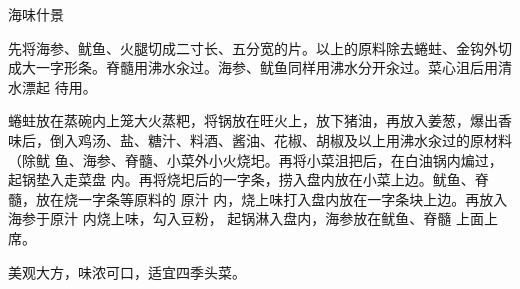 \begin{recipe}{海味什景}

\ingredients


\cooking

\step 先将海参、鱿鱼、火腿切成二寸长、五分宽的片。以上的原料除去蜷蛀、金钩外切
成大一字形条。脊髓用沸水汆过。海参、鱿鱼同样用沸水分开汆过。菜心沮后用清水漂起
待用。

\step 蜷蛀放在蒸碗内上笼大火蒸粑，将锅放在旺火上，放下猪油，再放入姜葱，爆出香
味后，倒入鸡汤、盐、糖汁、料酒、酱油、花椒、胡椒及以上用沸水汆过的原材料（除鱿
鱼、海参、脊髓、小菜外小火烧圯。再将小菜沮把后，在白油锅内煸过，起锅垫入走菜盘
内。再将烧圯后的一字条，捞入盘内放在小菜上边。鱿鱼、脊髓，放在烧一字条等原料的
原汁 内，烧上味打入盘内放在一字条块上边。再放入海参于原汁 内烧上味，勾入豆粉，
起锅淋入盘内，海参放在鱿鱼、脊髓 上面上席。

\notes

美观大方，味浓可口，适宜四季头菜。

\end{recipe}

